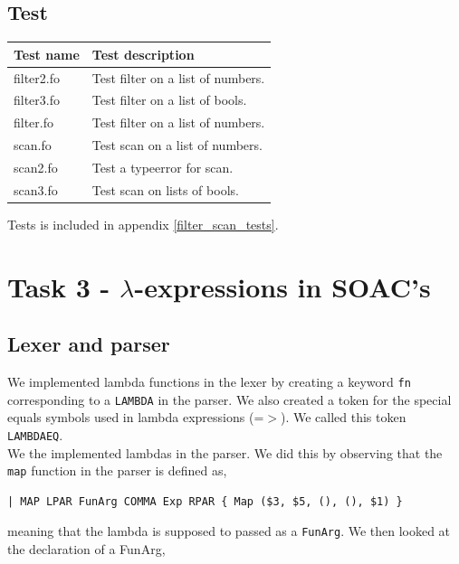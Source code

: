 \documentclass[11pt]{article}
\begin{document}
    \subsection{Test}
    \begin{tabular}{|l|l|}
        \hline
        \textbf{Test name} & \textbf{Test description}                        \\
        \hline
        filter2.fo         & Test filter on a list of numbers.                \\
        \hline
        filter3.fo         & Test filter on a list of bools.                  \\
        \hline
        filter.fo          & Test filter on a list of numbers.                \\
        \hline
        scan.fo            & Test scan on a list of numbers.                  \\
        \hline
        scan2.fo           & Test a typeerror for scan.                       \\
        \hline
        scan3.fo           & Test scan on lists of bools.                     \\
        \hline
    \end{tabular}

    Tests is included in appendix \ref{filter_scan_tests}.

    \section{Task 3 - $\lambda$-expressions in SOAC's}
    \subsection{Lexer and parser}
    We implemented lambda functions in the lexer by creating a keyword
    \texttt{fn} corresponding to a \texttt{LAMBDA} in the parser.  We also
    created a token for the special equals symbols used in lambda expressions
    (=$>$).  We called this token \texttt{LAMBDAEQ}.\\
    We the implemented lambdas
    in the parser.  We did this by observing that the \texttt{map} function in
    the parser is defined as,

    \begin{lstlisting}[firstnumber=105]
| MAP LPAR FunArg COMMA Exp RPAR { Map ($3, $5, (), (), $1) }
    \end{lstlisting}

    meaning that the lambda is supposed to passed as a \texttt{FunArg}.  We then
    looked at the declaration of a FunArg,
\end{document}
